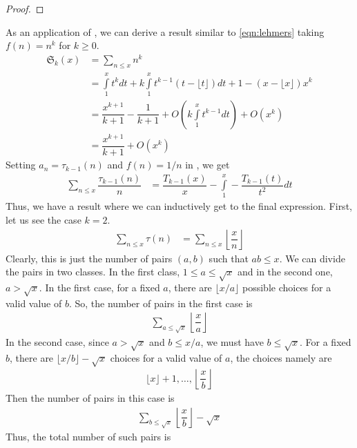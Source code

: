 \documentclass[elemannt.tex]{subfile}
\begin{document}
		\begin{proof}
			
		\end{proof}
	As an application of , we can derive a result similar to \ref{eqn:lehmers} taking  $f(n)=n^{k}$ for $k\geq 0$.
		\begin{align*}
			\mathfrak{S}_{k}(x)
				& = \sum_{n\leq x}n^{k}\\
				& = \int\limits_{1}^{x}t^{k}dt+k\int\limits_{1}^{x}t^{k-1}(t-\lfloor{t}\rfloor)dt+1-(x-\lfloor{x}\rfloor)x^{k}\\
				& = \dfrac{x^{k+1}}{k+1}-\dfrac{1}{k+1}+O\left(k\int\limits_{1}^{x}t^{k-1}dt\right)+O(x^{k})\\
				& = \dfrac{x^{k+1}}{k+1}+O(x^{k})
		\end{align*}
	Setting $a_{n}=\tau_{k-1}(n)$ and $f(n)=1/n$ in , we get
		\begin{align*}
			\sum_{n\leq x}\dfrac{\tau_{k-1}(n)}{n}
				& = \dfrac{T_{k-1}(x)}{x}-\int\limits_{1}^{x}-\dfrac{T_{k-1}(t)}{t^{2}}dt
		\end{align*}
	Thus, we have a result where we can inductively get to the final expression. First, let us see the case $k=2$.
		\begin{align*}
			\sum_{n\leq x}\tau(n)
				& = \sum_{n\leq x}\left\lfloor{\dfrac{x}{n}}\right\rfloor
		\end{align*}
	Clearly, this is just the number of pairs $(a,b)$ such that $ab\leq x$. We can divide the pairs in two classes. In the first class, $1\leq a\leq \sqrt{x}$ and in the second one, $a>\sqrt{x}$. In the first case, for a fixed $a$, there are $\lfloor{x/a}\rfloor$ possible choices for a valid value of $b$. So, the number of pairs in the first case is
		\begin{align*}
			\sum_{a\leq \sqrt{x}}\left\lfloor{\dfrac{x}{a}}\right\rfloor
		\end{align*}
	In the second case, since $a>\sqrt{x}$ and $b\leq x/a$, we must have $b\leq \sqrt{x}$. For a fixed $b$, there are $\lfloor{x/b}\rfloor-\sqrt{x}$ choices for a valid value of $a$, the choices namely are
		\begin{align*}
			\lfloor{x}\rfloor+1,\ldots,\left\lfloor{\dfrac{x}{b}}\right\rfloor
		\end{align*}
	Then the number of pairs in this case is
		\begin{align*}
			\sum_{b\leq \sqrt{x}}\left\lfloor{\dfrac{x}{b}}\right\rfloor-\sqrt{x}
		\end{align*}
	Thus, the total number of such pairs is
\end{document}
